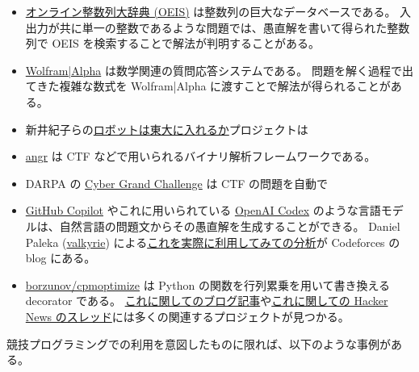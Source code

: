 \documentclass{ltjsarticle}
\begin{document}
\begin{itemize}
    \item \href{https://oeis.org/}{オンライン整数列大辞典 (OEIS)} は整数列の巨大なデータベースである。
        入出力が共に単一の整数であるような問題では、愚直解を書いて得られた整数列で OEIS を検索することで解法が判明することがある。
    \item \href{https://www.wolframalpha.com/}{Wolfram|Alpha} は数学関連の質問応答システムである。
        問題を解く過程で出てきた複雑な数式を Wolfram|Alpha に渡すことで解法が得られることがある。
    \item 新井紀子らの\href{https://21robot.org/}{ロボットは東大に入れるか}プロジェクトは
    \item \href{https://github.com/angr/angr}{angr} は CTF などで用いられるバイナリ解析フレームワークである。
    \item DARPA の \href{https://www.darpa.mil/program/cyber-grand-challenge}{Cyber Grand Challenge} は CTF の問題を自動で
    \item \href{https://copilot.github.com/}{GitHub Copilot} やこれに用いられている \href{https://openai.com/blog/openai-codex/}{OpenAI Codex} のような言語モデルは、自然言語の問題文からその愚直解を生成することができる。
        Daniel Paleka (\href{https://codeforces.com/profile/valkyrie}{valkyrie}) による\href{https://codeforces.com/blog/entry/94353}{これを実際に利用してみての分析}が Codeforces の blog にある。
    \item \href{https://github.com/borzunov/cpmoptimize}{borzunov/cpmoptimize} は Python の関数を行列累乗を用いて書き換える decorator である。
        \href{https://kukuruku.co/post/automatic-algorithms-optimization-via-fast-matrix-exponentiation/}{これに関してのブログ記事}や\href{https://news.ycombinator.com/item?id=17592359}{これに関しての Hacker News のスレッド}には多くの関連するプロジェクトが見つかる。
\end{itemize}

競技プログラミングでの利用を意図したものに限れば、以下のような事例がある。
\end{document}
